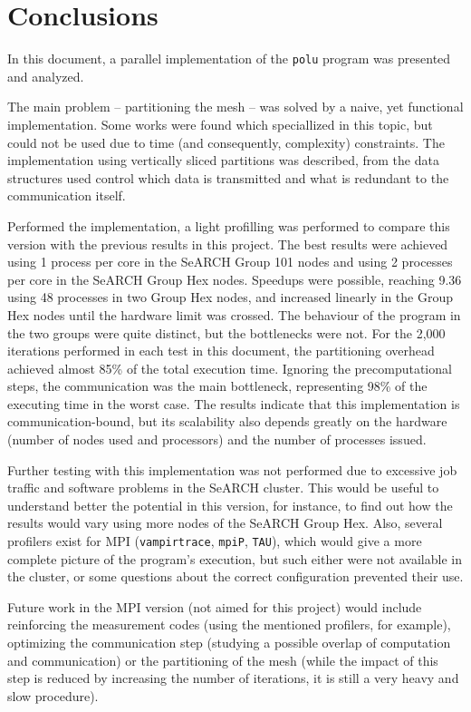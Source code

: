 \section{Conclusions}
\label{sec:conclusions}

In this document, a parallel implementation of the \texttt{polu} program was presented and analyzed.

The main problem -- partitioning the mesh -- was solved by a naive, yet functional implementation. Some works were found which speciallized in this topic, but could not be used due to time (and consequently, complexity) constraints. The implementation using vertically sliced partitions was described, from the data structures used control which data is transmitted and what is redundant to the communication itself.

Performed the implementation, a light profilling was performed to compare this version with the previous results in this project. The best results were achieved using 1 process per core in the SeARCH Group 101 nodes and using 2 processes per core in the SeARCH Group Hex nodes. Speedups were possible, reaching 9.36 using 48 processes in two Group Hex nodes, and increased linearly in the Group Hex nodes until the hardware limit was crossed. The behaviour of the program in the two groups were quite distinct, but the bottlenecks were not. For the 2,000 iterations performed in each test in this document, the partitioning overhead achieved almost 85\% of the total execution time. Ignoring the precomputational steps, the communication was the main bottleneck, representing 98\% of the executing time in the worst case. The results indicate that this implementation is communication-bound, but its scalability also depends greatly on the hardware (number of nodes used and processors) and the number of processes issued.

Further testing with this implementation was not performed due to excessive job traffic and software problems in the SeARCH cluster. This would be useful to understand better the potential in this version, for instance, to find out how the results would vary using more nodes of the SeARCH Group Hex. Also, several profilers exist for MPI (\texttt{vampirtrace}, \texttt{mpiP}, \texttt{TAU}), which would give a more complete picture of the program's execution, but such either were not available in the cluster, or some questions about the correct configuration prevented their use.

Future work in the MPI version (not aimed for this project) would include reinforcing the measurement codes (using the mentioned profilers, for example), optimizing the communication step (studying a possible overlap of computation and communication) or the partitioning of the mesh (while the impact of this step is reduced by increasing the number of iterations, it is still a very heavy and slow procedure).